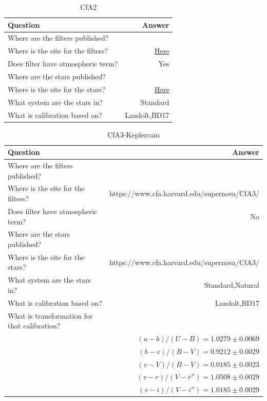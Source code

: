 \documentclass[twocolumn]{aastex63}
\begin{document}
\begin{table}
\caption{\large CfA2}
\begin{tabular}{lr}
\toprule
    Question & Answer \\
\hline

Where are the filters published? & \cite{CfA2} \\
Where is the site for the filters? & \href{https://iopscience.iop.org/article/10.1086/497989/fulltext/204512.tables.html}{Here} \\
Does filter have atmospheric term?	& Yes \\
Where are the stars published? & \cite{cfa2stars} \\
Where is the site for the stars? & \href{https://iopscience.iop.org/article/10.1086/497989/fulltext/204512.tables.html}{Here} \\
What system are the stars in? & Standard \\
What is calibration based on? & Landolt,BD17 \\
\end{tabular}
\end{table}



\begin{table}
\label{table:information}
\caption{\large CfA3-Keplercam}
\begin{tabular}{lr}
\toprule
    Question & Answer \\
\hline

Where are the filters published? & \cite{CfA3-Keplercam} \\
Where is the site for the filters? & https://www.cfa.harvard.edu/supernova/CfA3/ \\
Does filter have atmospheric term?	& No \\
Where are the stars published? & \cite{cfa3keplerstars} \\
Where is the site for the stars? & https://www.cfa.harvard.edu/supernova/CfA3/ \\
What system are the stars in? & Standard,Natural \\
What is calibration based on? & Landolt,BD17 \\
What is transformation for that calibration? & ~\\
~& $(u-b)/(U-B) = 1.0279 \pm 0.0069$ \\
~ & $(b-v)/(B-V) = 0.9212 \pm 0.0029$ \\
~ & $(v-V)/(B-V) = 0.0185 \pm 0.0023$ \\
~ & $(v-r)/(V-r'') = 1.0508 \pm 0.0029$ \\
~ & $(v-i)/(V-i'') = 1.0185 \pm 0.0029$ \\
\end{tabular}
\end{table}
\end{document}
